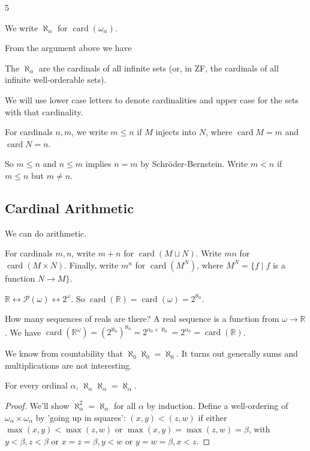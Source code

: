 \documentclass[a3paper, 10pt]{article}
\newcommand{\card}{\operatorname{card}}
\begin{document}
\begin{multicols*}{5}
\begin{definition}
  We write $\aleph_\alpha$ for $\card(\omega_\alpha)$.
\end{definition}

From the argument above we have

\begin{theorem}
  The $\aleph_\alpha$ are the cardinals of all infinite sets (or, in ZF, the cardinals of all infinite well-orderable sets).
\end{theorem}

We will use lower case letters to denote cardinalities and upper case for the sets with that cardinality.

\begin{definition}
  For cardinals $n, m$, we write $m \leq n$ if $M$ injects into $N$, where $\card M = m$ and $\card N = n$. 

  So $m \leq n$ and $n \leq m$ implies $n = m$ by Schr\"oder-Bernstein. Write $m < n$ if $m \leq n$ but $m \neq n$.
\end{definition}

\subsection{Cardinal Arithmetic}

We can do arithmetic.


\begin{definition}
  For cardinals $m, n$, write $m +n$ for $\card(M \sqcup N)$. Write $mn$ for $\card(M \times N)$. Finally, write $m^n$ for $\card(M^N)$, where $M^N = \{f \mid f$ is a function $N \rightarrow M\}$.
\end{definition}

\begin{example}
  $\mathbb{R} \leftrightarrow \mathcal{P}(\omega) \leftrightarrow 2^\omega$.
  So $\card(\mathbb{R}) = \card(\mathcal{\omega}) = 2^{\aleph_0}$.
\end{example}

\begin{example}
  How many sequences of reals are there? A real sequence is a function from $\omega \rightarrow \mathbb{R}$. We have $\card(\mathbb{R}^\omega) = (2^{\aleph_0})^{\aleph_0} = 2^{\alpha_0 \times \aleph_0} = 2^{\alpha_0} = \card(\mathbb{R})$.
\end{example}

We know from countability that $\aleph_0 \aleph_0 = \aleph_0$. It turns out generally sums and multiplications are not interesting.
\begin{theorem}
  For every ordinal $\alpha$, $\aleph_\alpha \aleph_\alpha = \aleph_\alpha$.
\end{theorem}
\begin{proof}
  We'll show $\aleph_\alpha^2=\aleph_\alpha$ for all $\alpha$ by induction. Define a well-ordering of $\omega_\alpha \times \omega_\alpha$ by 'going up in squares': $(x, y)<(z, w)$ if either $\max (x, y)<\max (z, w)$ or $\max (x, y)=\max (z, w)=\beta$, with $y<\beta, z<\beta$ or $x=z=\beta, y<w$ or $y=w=\beta, x<z$.


\end{proof}
\end{multicols*}
\end{document}
